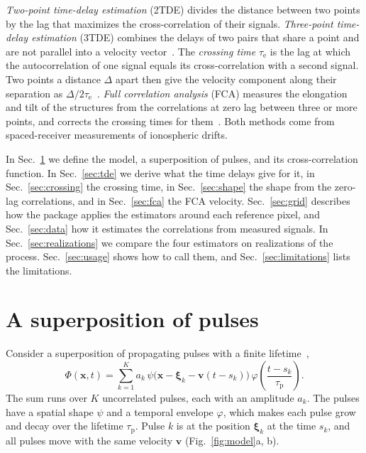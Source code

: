 \documentclass[aps,pre,11pt,a4paper,preprint,amsmath,amssymb,groupedaddress]{revtex4-2}
\newcommand{\Figref}[1]{Fig.~\ref{#1}}
\newcommand{\Secref}[1]{Sec.~\ref{#1}}
\newcommand{\br}{\ensuremath{\bm{x}}}
\newcommand{\bv}{\ensuremath{\bm{v}}}
\newcommand{\taud}{\ensuremath{\tau_\text{p}}}
\newcommand{\taue}{\ensuremath{\tau_\text{e}}}
\newcommand{\psh}{\ensuremath{\psi}}
\begin{document}
\emph{Two-point time-delay estimation} (2TDE) divides the distance between two points by the lag that maximizes the cross-correlation of their signals. \emph{Three-point time-delay estimation} (3TDE) combines the delays of two pairs that share a point and are not parallel into a velocity vector~\cite{losada_three-point_2024}. The \emph{crossing time} \taue{} is the lag at which the autocorrelation of one signal equals its cross-correlation with a second signal. Two points a distance $\Delta$ apart then give the velocity component along their separation as $\Delta/2\taue$~\cite{briggs_analysis_1950,woodman_true_1995,holloway_cross_1997}. \emph{Full correlation analysis} (FCA) measures the elongation and tilt of the structures from the correlations at zero lag between three or more points, and corrects the crossing times for them~\cite{phillips_effects_1955,briggs_analysis_1984,armstrong_analysis_1972,holloway_cross_1997a}. Both methods come from spaced-receiver measurements of ionospheric drifts.

In \Secref{sec:model} we define the model, a superposition of pulses, and its cross-correlation function. In \Secref{sec:tde} we derive what the time delays give for it, in \Secref{sec:crossing} the crossing time, in \Secref{sec:shape} the shape from the zero-lag correlations, and in \Secref{sec:fca} the FCA velocity. \Secref{sec:grid} describes how the package applies the estimators around each reference pixel, and \Secref{sec:data} how it estimates the correlations from measured signals. In \Secref{sec:realizations} we compare the four estimators on realizations of the process. \Secref{sec:usage} shows how to call them, and \Secref{sec:limitations} lists the limitations.

\section{A superposition of pulses}
\label{sec:model}

Consider a superposition of propagating pulses with a finite lifetime~\cite{pecseli_interpretation_1993,garcia_stochastic_2016},
%
\begin{equation}
\label{eq:process}
\Phi(\br,t) = \sum_{k=1}^{K} a_k\, \psh\big( \br - \bm{\xi}_k - \bv(t-s_k) \big)\, \varphi\!\left( \frac{t-s_k}{\taud} \right).
\end{equation}
%
The sum runs over $K$ uncorrelated pulses, each with an amplitude $a_k$. The pulses have a spatial shape \psh{} and a temporal envelope $\varphi$, which makes each pulse grow and decay over the lifetime \taud. Pulse $k$ is at the position $\bm{\xi}_k$ at the time $s_k$, and all pulses move with the same velocity \bv{} (\Figref{fig:model}a, b).
\end{document}

